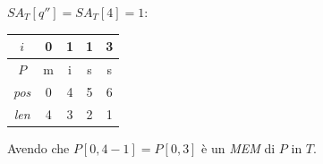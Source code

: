 \begin{esempio}
  $SA_T[q'']=SA_T[4]=1$: 
  \begin{table}[H]
    \centering
    \begin{tabular}{c||c|c|c|c}
      $i$ & 0 & 1 & 1 & 3 \\
      \hline
      $P$ & m & i & s & s \\
      \hline
      \hline
      \textit{pos} & 0 & 4 & 5 & 6\\
      \hline
      \textit{len} & 4 & 3 & 2 & 1\\
    \end{tabular}
  \end{table}
  Avendo che $P[0,4-1]=P[0,3]$ è un \textit{MEM} di $P$ in $T$. 
\end{esempio}
